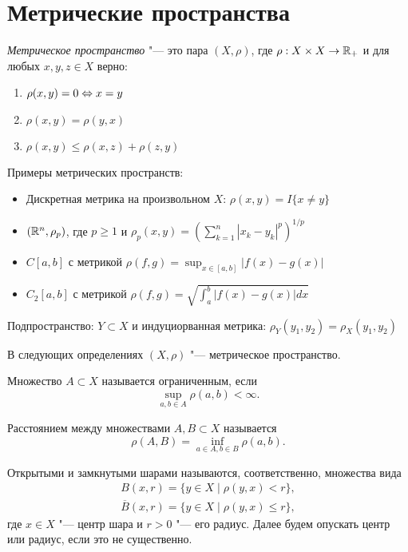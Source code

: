 \documentclass[main]{subfiles}
\begin{document}
\section{Метрические пространства}

\begin{definition}
  \emph{Метрическое пространство} "--- это
  пара \( (X, \rho) \), где \( \rho : X \times X \to \mathbb{R}_+ \) и
  для любых \( x, y, z \in X \) верно:
  \begin{enumerate}
    \item \( \rho(x, y) = 0 \Leftrightarrow x = y \)
    \item \( \rho(x, y) = \rho(y, x) \)
    \item \( \rho(x, y) \le \rho(x, z) + \rho(z, y) \)
  \end{enumerate}
\end{definition}

Примеры метрических пространств:
\begin{itemize}
  \item Дискретная метрика на произвольном \( X \):
    \( \rho(x, y) = I\{ x \ne y \} \)
  \item 
    \( (\mathbb{R}^n, \rho_p) \), где \( p \ge 1 \) и
    \( \rho_p(x, y) = \left( \sum_{k=1}^{n}
    |x_k - y_k|^p \right)^{1/p} \)
  \item 
    \( C[a, b] \) с метрикой
    \( \rho(f, g) = \sup_{x \in [a, b]} |f(x) - g(x)| \)
  \item \( C_2[a, b] \) с метрикой
    \( \rho(f, g) = \sqrt{\int_a^b |f(x) - g(x)| dx} \)
\end{itemize}

  Подпространство: \( Y \subset X \) и индуциорванная метрика:
  \( \rho_Y(y_1, y_2) = \rho_X(y_1, y_2) \) 

В следующих определениях \( (X, \rho) \) "---
метрическое пространство.
  
\begin{definition}
  Множество \( A \subset X \) называется ограниченным,
  если
  \[ \sup_{a, b \in A} \rho(a, b) < \infty. \]
\end{definition}

\begin{definition}
  Расстоянием между множествами \( A, B \subset X \)
  называется
  \[ \rho(A, B) = \inf_{a \in A, b \in B} \rho(a, b). \]
\end{definition}

\begin{definition}
  Открытыми и замкнутыми шарами называются, соответственно, множества вида
  \begin{gather}
    B(x, r) = \{ y \in X \mid \rho(y, x) < r \}, \\
    \overline{B}(x, r) = \{ y \in X \mid \rho(y, x) \le r \},
  \end{gather}
  где \( x \in X \) "--- центр шара и \( r > 0 \) "--- его радиус.
  Далее будем опускать центр или радиус, если это не существенно.
\end{definition}
\end{document}
